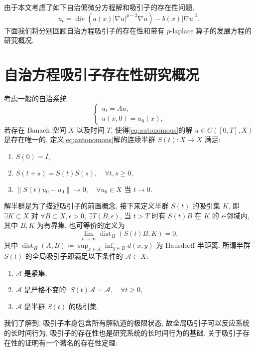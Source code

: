 \documentclass[oneside,longtitle]{LZUthesis}
\numberwithin{equation}{chapter}
\newcommand*\abs[1]{\lvert#1\rvert}
\newcommand*\norm[1]{\lVert#1\rVert}
\DeclareMathOperator{\Div}{div}
\DeclareMathOperator{\dist}{dist}
\begin{document}
由于本文考虑了如下自治偏微分方程解和吸引子的存在性问题,
\begin{equation*}
	u_t = \Div(a(x)\abs{\nabla u}^{p-2}\nabla u) - b(x)\abs{\nabla u}^2,
\end{equation*}
下面我们将分别回顾自治方程吸引子的存在性和带有 $p$-laplace 算子的发展方程的研究概况.

\section{自治方程吸引子存在性研究概况}
考虑一般的自治系统
\begin{equation}\label{eq:autonomous}
	\begin{cases}
		u_t = Au,\\
		u(x, 0) = u_0(x),
	\end{cases}
\end{equation}
若存在 Banach 空间 $X$ 以及时间 $T$, 使得\cref{eq:autonomous}的解 $u \in C([0, T], X)$ 是存在唯一的,
定义\cref{eq:autonomous}解的连续半群 $S(t) \colon X \to X$ 满足:
\begin{enumerate}[itemindent = -1em]
	\item $S(0) = I,$
	\item $S(t + s) = S(t)S(s), \quad \forall t, s \geq 0,$
	\item $\norm{S(t)u_0 - u_0} \to 0, \quad\forall u_0 \in X$ 当 $t \to 0$.
\end{enumerate}
解半群是为了描述吸引子的前置概念, 接下来定义半群 $S(t)$ 的吸引集 $K$,
即 $\exists K \subset X$
对 $\forall B \subset X, \epsilon > 0$, $\exists T(B, \epsilon)$,
当 $t > T$ 时有 $S(t)B$ 在 $K$ 的 $\epsilon$-邻域内,
其中 $B, K$ 为有界集, 也可等价的定义为
\begin{equation*}
	\lim_{t \to \infty} \dist_H(S(t)B, K) = 0,
\end{equation*}
其中 $\dist_H(A, B) \coloneqq \sup_{x \in A}\inf_{y \in B}d(x, y)$ 为 Hausdorff 半距离.
所谓半群 $S(t)$ 的全局吸引子即满足以下条件的 $\mathcal{A} \subset X$:
\begin{enumerate}[itemindent = -1em]
	\item $\mathcal{A}$ 是紧集,
	\item $\mathcal{A}$ 是严格不变的: $S(t)\mathcal{A} = \mathcal{A}, \quad\forall t \geq 0$,
	\item $\mathcal{A}$ 是半群 $S(t)$ 的吸引集.
\end{enumerate}
我们了解到, 吸引子本身包含所有解轨道的极限状态,
故全局吸引子可以反应系统的长时间行为, 吸引子的存在性也是研究系统的长时间行为的基础.
关于吸引子存在性的证明有一个著名的存在性定理:
\end{document}

